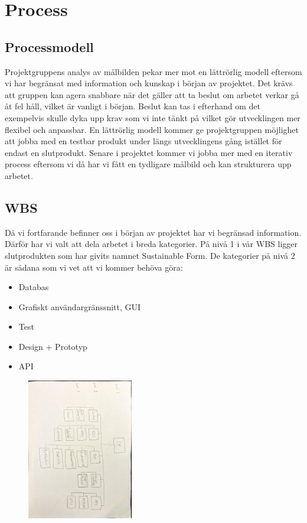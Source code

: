 \documentclass{article}
\begin{document}
\newpage
\section{Process}
\subsection{Processmodell}

Projektgruppens analys av målbilden pekar mer mot en lättrörlig modell eftersom vi har begränsat med information och kunskap i början av projektet.
Det krävs att gruppen kan agera snabbare när det gäller att ta beslut om arbetet verkar gå åt fel håll, vilket är vanligt i början. Beslut kan tas i
efterhand om det exempelvis skulle dyka upp krav som vi inte tänkt på vilket gör
utvecklingen mer flexibel och anpassbar. En lättrörlig modell kommer ge projektgruppen
möjlighet att jobba med en testbar produkt under längs utvecklingens gång istället för endast
en slutprodukt. Senare i projektet kommer vi jobba mer med en iterativ process eftersom vi
då har vi fått en tydligare målbild och kan strukturera upp arbetet.
\subsection{WBS}
Då vi fortfarande befinner oss i början av projektet har vi begränsad information. Därför har vi valt att dela arbetet i breda kategorier. På nivå 1 i vår WBS ligger slutprodukten som har givits namnet Sustainable Form. De kategorier på nivå 2 är sådana som vi vet att vi kommer behöva göra: 
\begin{itemize}
\item Databas
\item Grafiskt användargränssnitt, GUI
\item Test
\item Design + Prototyp
\item API
\end{itemize}
\begin{figure}[htp]
    \centering
    \includegraphics[width = 175px,angle=90]{WBS.jpg}
    \label{fig:24}
\end{figure}
\end{document}
